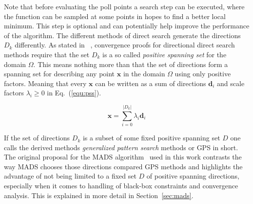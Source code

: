 \documentclass[a4paper,10pt]{article}
\renewcommand{\vec}[1]{\mathbf{#1}}
\newcommand{\equref}[1]{Eq.~(\ref{#1})}
\newcommand{\secref}[1]{Section~\ref{#1}}
\begin{document}
    Note that before evaluating the poll points a search step can
    be executed, where the function can be sampled at some
    points in hopes to find a better local minimum.
    This step is optional and can potentially help improve the 
    performance of the algorithm.
    The different methods of direct search generate the directions
    $D_k$ differently.
    As stated in ~\cite{derivative_free_methods}, convergence
    proofs for directional direct search methods require that the
    set $D_k$ is a so called \emph{positive spanning set} for the
    domain $\Omega$.
    This means nothing more than that the set of directions form
    a spanning set for describing any point $\vec{x}$ in the domain $\Omega$
    using only positive factors.
    Meaning that every $\vec{x}$ can be written as a sum of 
    directions $\vec{d}_i$ and scale factors $\lambda_i \geq 0$ in 
    \equref{equ:pss}.

    \begin{equation}
        \label{equ:pss}
        \vec{x} = \sum_{i=0}^{|D_k|} \lambda_i \vec{d}_i
    \end{equation}

    If the set of directions $D_k$ is a subset of some fixed
    positive spanning set $D$ one calls the derived methods
    \emph{generalized pattern search} methods or GPS in short.
    The original proposal for the MADS algorithm~\cite{mads_original}
    used in this work contrasts the way MADS chooses those directions
    compared GPS methods and highlights the advantage of not being
    limited to a fixed set $D$ of positive spanning directions,
    especially when it comes to handling of black-box constraints
    and convergence analysis.
    This is explained in more detail in \secref{sec:mads}.
\end{document}
